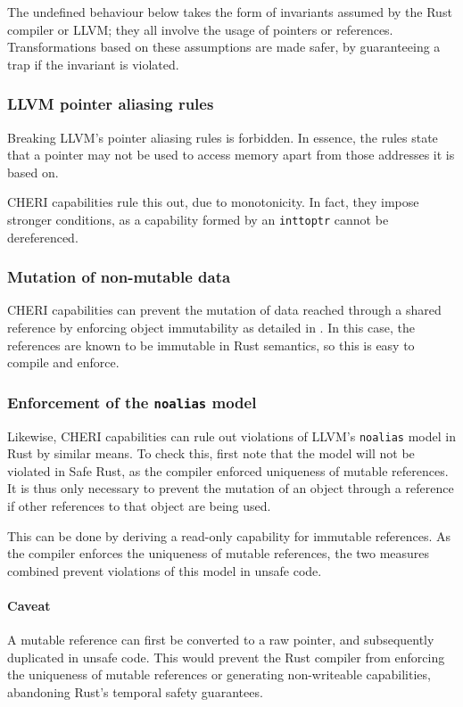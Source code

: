 \documentclass[dissertation.tex]{subfiles}
\begin{document}
The undefined behaviour below takes the form of invariants assumed by
the Rust compiler or LLVM; they all involve the usage of pointers or
references.
Transformations based on these assumptions are made safer, by
guaranteeing a trap if the invariant is violated.

\subsubsection{LLVM pointer aliasing rules}
Breaking LLVM's pointer aliasing rules is forbidden.
In essence, the rules state that a pointer may not be used to access
memory apart from those addresses it is based on.

CHERI capabilities rule this out, due to monotonicity.
In fact, they impose stronger conditions, as a capability formed by an
\texttt{inttoptr} cannot be dereferenced.

\subsubsection{Mutation of non-mutable data}
CHERI capabilities can prevent the mutation of data reached through a
shared reference by enforcing object immutability as detailed in
.
In this case, the references are known to be immutable in Rust
semantics, so this is easy to compile and enforce.

\subsubsection{Enforcement of the \texttt{noalias} model}
Likewise, CHERI capabilities can rule out violations of LLVM's
\texttt{noalias} model in Rust by similar means.
To check this, first note that the model will not be violated in Safe
Rust, as the compiler enforced uniqueness of mutable references.
It is thus only necessary to prevent the mutation of an object through a
reference if other references to that object are being used.

This can be done by deriving a read-only capability for immutable
references.
As the compiler enforces the uniqueness of mutable references, the two
measures combined prevent violations of this model in unsafe code.

\paragraph{Caveat}
A mutable reference can first be converted to a raw pointer, and
subsequently duplicated in unsafe code.
This would prevent the Rust compiler from enforcing the uniqueness of
mutable references or generating non-writeable capabilities, abandoning
Rust's temporal safety guarantees.
\end{document}
